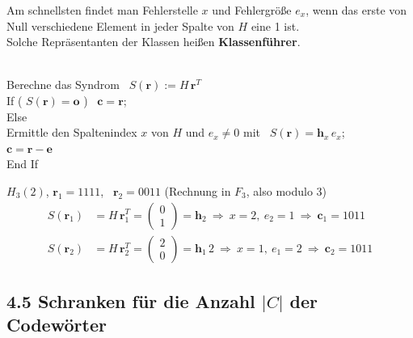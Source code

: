 \begin{definition}[Klassenführer]
Am schnellsten findet man Fehlerstelle $x$ und Fehlergröße $e_x$, wenn das erste von Null verschiedene Element in jeder Spalte von $H$ eine 1 ist.\\
Solche Repräsentanten der Klassen heißen \textbf{Klassenführer}.
\end{definition}

\begin{algorithmus}
\ \\
Berechne das Syndrom \ $S(\mathbf{r}) := H\,\mathbf{r}^T$\\
If ( $S(\mathbf{r}) = \mathbf{o}$ ) \ $\mathbf{c} = \mathbf{r}$;\\
Else\\
\hspace*{2em} Ermittle den Spaltenindex $x$ von $H$ und $e_x \neq 0$ mit \ $S(\mathbf{r}) = \mathbf{h}_x\,e_x$;\\
\hspace*{2em} $\mathbf{c} = \mathbf{r} - \mathbf{e}$\\
End If
\end{algorithmus}

\begin{beispiel}
$H_3(2)$, \quad $\mathbf{r}_1 = 1111$, \ $\mathbf{r}_2 = 0011$ \quad (Rechnung in $F_3$, also modulo 3)
\begin{align*}
S(\mathbf{r}_1) &= H\,\mathbf{r}_1^T = \begin{pmatrix} 0 \\ 1 \end{pmatrix} = \mathbf{h}_2 \ \Rightarrow \ x = 2,\ e_2 = 1 \ \Rightarrow \ \mathbf{c}_1 = 1011 \\
S(\mathbf{r}_2) &= H\,\mathbf{r}_2^T = \begin{pmatrix} 2 \\ 0 \end{pmatrix} = \mathbf{h}_1\,2 \ \Rightarrow \ x = 1,\ e_1 = 2 \ \Rightarrow \ \mathbf{c}_2 = 1011
\end{align*}
\end{beispiel}

\subsection{4.5 Schranken für die Anzahl $|C|$ der Codewörter}

